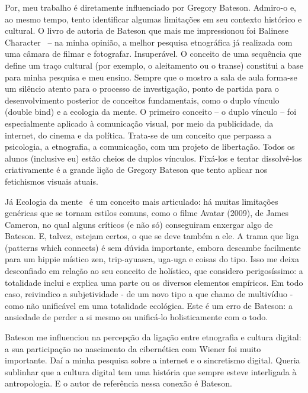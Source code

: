 \documentclass[a4paper, 12pt]{article} %
\begin{document}
Por, meu trabalho é diretamente influenciado por Gregory Bateson. Admiro-o e, ao mesmo tempo, tento identificar algumas limitações em seu contexto histórico e cultural. O livro de autoria de Bateson que mais me impressionou foi Balinese Character~\cite{b4} – na minha opinião, a melhor pesquisa etnográfica já realizada com uma câmara de filmar e fotografar. Insuperável. O conceito de uma sequência que define um traço cultural (por exemplo, o aleitamento ou o transe) constitui a base para minha pesquisa e meu ensino. Sempre que o mostro a sala de aula forma-se um silêncio atento para o processo de investigação, ponto de partida para o desenvolvimento posterior de conceitos fundamentais, como o duplo vínculo (double bind) e a ecologia da mente. O primeiro conceito – o duplo vínculo – foi especialmente aplicado à comunicação visual, por meio da publicidade, da internet, do cinema e da política. Trata-se de um conceito que perpassa a psicologia, a etnografia, a comunicação, com um projeto de libertação. Todos os alunos (inclusive eu) estão cheios de duplos vínculos. Fixá-los e tentar dissolvê-los criativamente é a grande lição de Gregory Bateson que tento aplicar nos fetichismos visuais atuais.

Já Ecologia da mente~\cite{b5} é um conceito mais articulado: há muitas limitações genéricas que se tornam estilos comuns, como o filme Avatar (2009), de James Cameron, no qual alguns críticos (e não só) conseguiram enxergar algo de Bateson. E, talvez, estejam certos, o que se deve também a ele. A trama que liga (patterns which connects) é sem dúvida importante, embora descambe facilmente para um hippie místico zen, trip-ayuasca, uga-uga e coisas do tipo. Isso me deixa desconfiado em relação ao seu conceito de holístico, que considero perigosíssimo: a totalidade inclui e explica uma parte ou os diversos elementos empíricos. Em todo caso, reivindico a subjetividade - de um novo tipo a que chamo de multivíduo -  como não unificável em uma totalidade ecológica. Este é um erro de Bateson: a ansiedade de perder a si mesmo ou unificá-lo holisticamente com o todo.

Bateson me influenciou na percepção da ligação entre etnografia e cultura digital: a sua participação no nascimento da cibernética com Wiener foi muito importante. Daí a minha pesquisa sobre a internet e o sincretismo digital. Queria sublinhar que a cultura digital tem uma história que sempre esteve interligada à antropologia. E o autor de referência nessa conexão é Bateson. 
\end{document}
